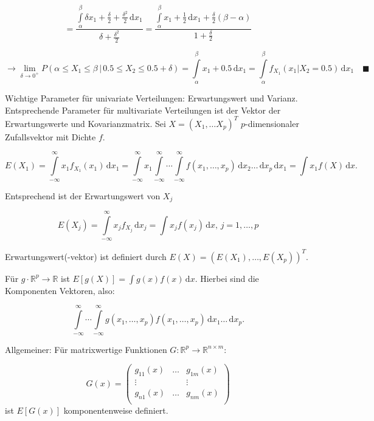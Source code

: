 \documentclass[12pt, a4paper]{article}
\theoremstyle{plain}
\theoremstyle{definition}
\newcommand{\R}{\mathbb{R}}
\newcommand{\1}{\mathds{1}}
\renewcommand{\d}{\,\mathrm{d}}
\begin{document}
\[ = \frac{ \int\limits_\alpha^{\beta} \delta x_1 + \frac{\delta}{2} + \frac{\delta^2}{2} \d x_1} {\delta + \frac{\delta^2}{2}} =  \frac{ \int\limits_\alpha^\beta x_1 + \frac{1}{2} \d x_1 + \frac{\delta}{2}  (\beta - \alpha)} {1 + \frac{\delta}{2}}\]

 \[\rightarrow  \lim_{\delta \to 0^{+}}
  P(\alpha \leq X_1 \leq \beta\, | \, 0.5 \leq X_2 \leq 0.5 + \delta) = \int\limits_{\alpha}^{\beta} x_1 + 0.5 \d x_1 = \int\limits_{\alpha}^\beta f_{X_1}(x_1 | X_2 = 0.5) \d x_1  \quad \blacksquare\]

Wichtige Parameter für univariate Verteilungen: Erwartungswert und Varianz. Entsprechende Parameter für multivariate Verteilungen ist der Vektor der Erwartungswerte und Kovarianzmatrix. Sei $X = (X_1, \ldots X_p)^T$ $p$-dimensionaler Zufallsvektor mit Dichte $f$. 

\[  E(X_1) = \int\limits_{-\infty}^{\infty} x_1 f_{X_1}(x_1) \d x_1  = \int\limits_{-\infty}^{\infty} x_1   \int\limits_{-\infty}^{\infty} \cdots \int\limits_{-\infty}^{\infty} f(x_1, \ldots, x_p) \d x_2 \ldots \d x_p \d x_1 =  \int x_1 f(X) \d x.  \]

Entsprechend ist der Erwartungswert von $X_j$

\[  E(X_j) =  \int\limits_{-\infty}^{\infty} x_j f_{X_j} \d x_j = \int x_j f(x_j) \d x, \, j = 1, \ldots , p \]


Erwartungswert(-vektor) ist definiert durch $E(X) = (E(X_1), \ldots, E(X_p))^T$.


Für $g \cdot \R^p \to \R$ ist $E[g(X)] = \int g(x) f(x) \d x.$ Hierbei sind die Komponenten Vektoren, also:

\[  \int\limits_{-\infty}^{\infty} \cdots \int\limits_{-\infty}^{\infty} g(x_1, \ldots, x_p) f(x_1, \ldots, x_p) \d x_1 \ldots \d x_p . \]

Allgemeiner: Für matrixwertige Funktionen $G: \R^p \to \R^{n\times m}$:

\[   G(x) = \begin{pmatrix}

g_{11}(x)  & \ldots & g_{1m}(x) \\
\vdots & & \vdots \\
g_{n1}(x) & \ldots & g_{nm}(x) \\


\end{pmatrix}  \]
ist $E[G(x)]$ komponentenweise definiert.



\end{document}

